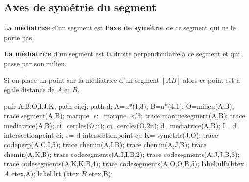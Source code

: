 \begin{changemargin}{0mm}{-15mm}
\section{Axes de symétrie du segment}
\begin{definition}
    La \textbf{médiatrice} d'un segment est \textbf{l'axe de symétrie} de ce segment qui ne le porte pas.
\end{definition}

\begin{propriete}[\admise]
    \textbf{La médiatrice} d'un segment est la droite perpendiculaire à ce segment et qui passe par son milieu.
\end{propriete}

\begin{minipage}{0.7\linewidth}
    \begin{propriete}[\admise]
        Si on place un point sur la médiatrice d'un segment $[AB]$ alors ce point est à égale distance de $A$ et $B$.
    \end{propriete}
\end{minipage}
\begin{minipage}{0.25\linewidth}
    \begin{center}
        \begin{Geometrie}[CoinHD={(5u,4u)}]    
            pair A,B,O,I,J,K;
            path ci,cj;
            path d;
            A=u*(1,3);
            B=u*(4,1);
            O=milieu(A,B);
            trace segment(A,B);
            marque_s:=marque_s/3;
            trace marquesegment(A,B);
            trace mediatrice(A,B);
            ci=cercles(O,u);
            cj=cercles(O,2u);
            d=mediatrice(A,B);
            I= d intersectionpoint ci;
            J= d intersectionpoint cj;
            K= symetrie(J,O);
            trace codeperp(A,O,I,5);
            trace chemin(A,I,B);
            trace chemin(A,J,B);
            trace chemin(A,K,B);
            trace codesegments(A,I,I,B,2);
            trace codesegments(A,J,J,B,3);
            trace codesegments(A,K,K,B,4);
            trace codesegments(A,O,O,B,5);
            label.ulft(btex $A$ etex,A);
            label.lrt (btex $B$ etex,B);
        \end{Geometrie}
    \end{center}
\end{minipage}


\end{changemargin}
